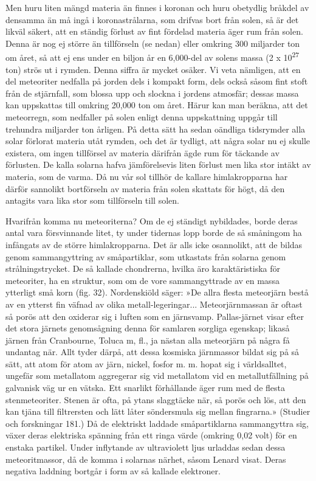 \documentclass[a4paper, 12pt, oneside, swedish]{article}
\begin{document}
Men huru liten mängd materia än finnes i koronan och huru obetydlig bråkdel av densamma än må ingå i koronastrålarna, som drifvas bort från solen, så är det likväl säkert, att en ständig förlust av fint fördelad materia äger rum från solen. Denna är nog ej större än tillförseln (se nedan) eller omkring 300 miljarder ton om året, så att ej ens under en biljon år en 6,000-del av solens massa (2 x 10\textsuperscript{27} ton) strös ut i rymden. Denna siffra är mycket osäker. Vi veta nämligen, att en del meteoriter nedfalla på jorden dels i kompakt form, dels också såsom fint stoft från de stjärnfall, som blossa upp och slockna i jordens atmosfär; dessas massa kan uppskattas till omkring 20,000 ton om året. Härur kan man beräkna, att det meteorregn, som nedfaller på solen enligt denna uppskattning uppgår till trehundra miljarder ton årligen. På detta sätt ha sedan oändliga tidsrymder alla solar förlorat materia utåt rymden, och det är tydligt, att några solar nu ej skulle existera, om ingen tillförsel av materia därifrån ägde rum för täckande av förlusten. De kalla solarna hafva jämförelsevis liten förlust men lika stor intäkt av materia, som de varma. Då nu vår sol tillhör de kallare himlakropparna har därför sannolikt bortförseln av materia från solen skattats för högt, då den antagits vara lika stor som tillförseln till solen.

Hvarifrån komma nu meteoriterna? Om de ej ständigt nybildades, borde deras antal vara försvinnande litet, ty under tidernas lopp borde de så småningom ha infångats av de större himlakropparna. Det är alls icke osannolikt, att de bildas genom sammangyttring av småpartiklar, som utkastats från solarna genom strålningstrycket. De så kallade chondrerna, hvilka äro karaktäristiska för meteoriter, ha en struktur, som om de vore sammangyttrade av en massa ytterligt små korn (fig. 32). Nordenskiöld säger: »De allra flesta meteorjärn bestå av en ytterst fin väfnad av olika metall-legeringar... Meteorjärnmassan är oftast så porös att den oxiderar sig i luften som en järnsvamp. Pallas-järnet visar efter det stora järnets genomsågning denna för samlaren sorgliga egenskap; likaså järnen från Cranbourne, Toluca m, fl., ja nästan alla meteorjärn på några få undantag när. Allt tyder därpå, att dessa kosmiska järnmassor bildat sig på så sätt, att atom för atom av järn, nickel, fosfor m. m. hopat sig i världsalltet, ungefär som metallatom aggregerar sig vid metallatom vid en metallutfällning på galvanisk väg ur en vätska. Ett snarlikt förhållande äger rum med de flesta stenmeteoriter. Stenen är ofta, på ytans slaggtäcke när, så porös och lös, att den kan tjäna till filtrersten och lätt låter söndersmula sig mellan fingrarna.» (Studier och forskningar 181.) Då de elektriskt laddade småpartiklarna sammangyttra sig, växer deras elektriska spänning från ett ringa värde (omkring 0,02 volt) för en enstaka partikel. Under inflytande av ultraviolett ljus urladdas sedan dessa meteoritmassor, då de komma i solarnas närhet, såsom Lenard visat. Deras negativa laddning bortgår i form av så kallade elektroner.
\end{document}
